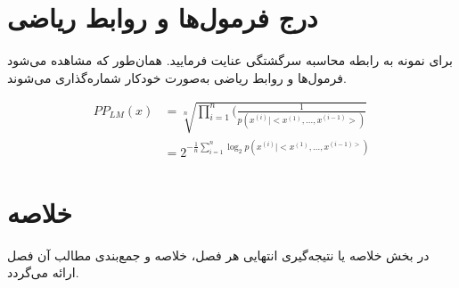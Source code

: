  
 \section{درج فرمول‌ها و روابط ریاضی}
 برای نمونه به رابطه محاسبه سرگشتگی عنایت فرمایید. همان‌طور که مشاهده می‌شود فرمول‌ها و روابط ریاضی به‌صورت خودکار شماره‌گذاری می‌شوند.
 
  \begin{equation}\label{ppl}
     \begin{split}
         PP_{LM}(x) & = \sqrt[n]{\prod_{i=1}^n(\frac{1}{p(x^{(i)}|<x^{(1)}, ..., x^{(i-1)}>)}} \\
         & = 2^{-\frac{1}{n}\sum_{i=1}^n\log_{2}{p(x^{(i)}|<x^{(1)}, ..., x^{(i-1)>})}}
     \end{split}
 \end{equation}
 
 
 
 \section{خلاصه}
 ‌در بخش خلاصه یا نتیجه‌گیری انتهایی هر فصل، خلاصه و جمع‌بندی مطالب آن فصل ارائه می‌گردد. 
 
 